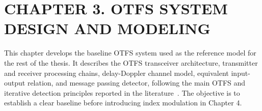 \section*{CHAPTER 3. OTFS SYSTEM DESIGN AND MODELING}

\setcounter{section}{3}
\setcounter{subsection}{0}
\setcounter{subsubsection}{0}
\setcounter{figure}{0}
\setcounter{table}{0}
\setcounter{equation}{0}

\renewcommand{\thefigure}{3.\arabic{figure}}
\renewcommand{\thetable}{3.\arabic{table}}
\renewcommand{\theequation}{3.\arabic{equation}}
\renewcommand{\theHfigure}{3.\arabic{figure}}
\renewcommand{\theHtable}{3.\arabic{table}}
\renewcommand{\theHequation}{3.\arabic{equation}}

This chapter develops the baseline OTFS system used as the reference model for the rest of the thesis. It describes the OTFS transceiver architecture, transmitter and receiver processing chains, delay-Doppler channel model, equivalent input-output relation, and message passing detector, following the main OTFS and iterative detection principles reported in the literature~\cite{Hadani2018OTFS,Raviteja2018OTFSMP,Raviteja2018OTFSInterference}. The objective is to establish a clear baseline before introducing index modulation in Chapter 4.

